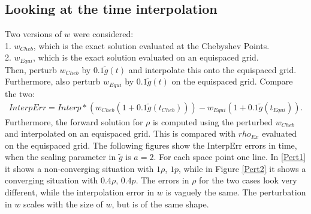 \documentclass[11pt, a4paper]{article}
\theoremstyle{definition}
\begin{document}
	\subsection*{Looking at the time interpolation}
	Two versions of $w$ were considered:\\
	 1. $w_{Cheb}$, which is the exact solution evaluated at the Chebyshev Points.\\
	 2. $w_{Equi}$, which is the exact solution evaluated on an equispaced grid.\\
	Then, perturb $w_{Cheb}$ by $0.1 \tilde g(t)$ and interpolate this onto the equispaced grid.\\
	Furthermore, also perturb $w_{Equi}$ by $0.1\tilde g(t)$ on the equispaced grid.
	Compare the two:
	\begin{align*}
	InterpErr = Interp*(w_{Cheb}(1 + 0.1\tilde g(t_{Cheb})))  - w_{Equi}(1+0.1\tilde g(t_{Equi})).
	\end{align*}
	Furthermore, the forward solution for $\rho$ is computed using the perturbed $w_{Cheb}$ and interpolated on an equispaced grid. This is compared with $rho_{Ex}$ evaluated on the equispaced grid.
	The following figures show the InterpErr errors in time, when the scaling parameter in $\tilde g$ is $a = 2$. For each space point one line. In \ref{Pert1} it shows a non-converging situation with $1\rho$, $1p$, while in Figure \ref{Pert2} it shows a converging situation with $0.4\rho$, $0.4 p$. The errors in $\rho$ for the two cases look very different, while the interpolation error in $w$ is vaguely the same. The perturbation in $w$ scales with the size of $w$, but is of the same shape. 
\end{document}
